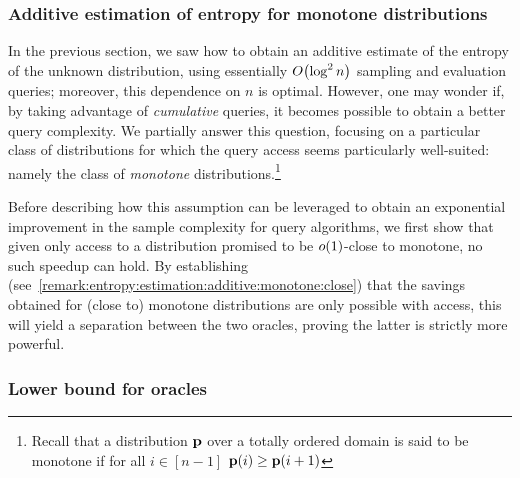 \subsubsection{Additive estimation of entropy for monotone distributions}\label{sec:supportsize:entropy:monotone}
In the previous section, we saw how to obtain an additive estimate of the entropy of the unknown distribution, using essentially $\bigO{\log^2 n}$ sampling and evaluation queries; moreover, this dependence on $n$ is optimal. However, one may wonder if, by taking advantage of \emph{cumulative} queries, it becomes possible to obtain a better query complexity. We partially answer this question, focusing on a particular class of distributions for which the \cdfsamp query access seems particularly well-suited: namely the class of \emph{monotone} distributions.\footnote{Recall that a distribution $\mathbf{p}$ over a totally ordered domain is said to be monotone if for all $i\in[n-1]$ $\mathbf{p}(i)\geq \mathbf{p}(i+1)$}

Before describing how this assumption can be leveraged to obtain an exponential improvement in the sample complexity for \cdfsamp query algorithms, we first show that given only \emph{\pdfsamp} access to a distribution promised to be $\littleO{1}$-close to monotone, no such speedup can hold. By establishing (see~\cref{remark:entropy:estimation:additive:monotone:close}) that the savings obtained for (close to) monotone distributions are only possible with \cdfsamp access, this will yield a separation between the two oracles, proving the latter is strictly more powerful.

\subsubsection{Lower bound for \pdfsamp oracles}

